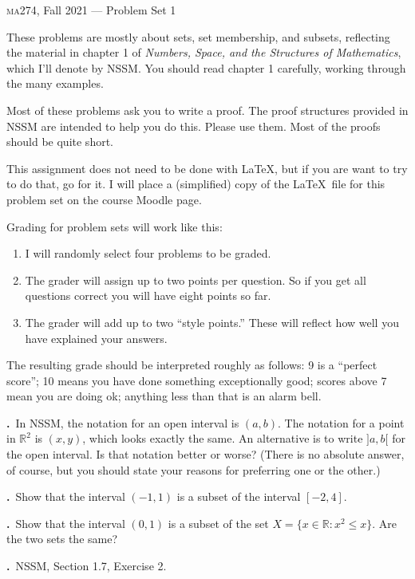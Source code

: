 \documentclass[12pt]{article}
\newcommand{\R}{\ensuremath{\mathbb{R}}}
\newcounter{wowser}
\newcommand{\wowser}{\stepcounter{wowser}\par\vspace{\baselineskip}\noindent\textbf{\thewowser.}~}
\begin{document}
\vspace*{\baselineskip}

\centerline{\large\textsc{ma}274, Fall 2021 --- Problem Set 1}

\vspace{2\baselineskip}

These problems are mostly about sets, set membership, and subsets,
reflecting the material in chapter 1 of \textit{Numbers, Space, and
  the Structures of Mathematics}, which I'll denote by NSSM. You
should read chapter 1 carefully, working through the many examples.

Most of these problems ask you to write a proof. The proof structures
provided in NSSM are intended to help you do this. Please use
them. Most of the proofs should be quite short.

This assignment does not need to be done with \LaTeX, but if you are
want to try to do that, go for it. I will place a (simplified) copy of
the \LaTeX\ file for this problem set on the course Moodle page.

Grading for problem sets will work like this:
\begin{enumerate}
\item I will randomly select four problems to be graded.
\item The grader will assign up to two points per question. So if you
  get all questions correct you will have eight points so far.
\item The grader will add up to two ``style points.'' These will
  reflect how well you have explained your answers.
\end{enumerate}
The resulting grade should be interpreted roughly as follows: 9 is a
``perfect score''; 10 means you have done something exceptionally
good; scores above 7 mean you are doing ok; anything less than that is
an alarm bell.

\wowser In NSSM, the notation for an open interval is $(a,b)$. The
notation for a point in $\R^2$ is $(x,y)$, which looks exactly the
same. An alternative is to write $]a,b[$ for the open interval. Is
that notation better or worse? (There is no absolute answer, of
course, but you should state your reasons for preferring one or the
other.)

\wowser Show that the interval $(-1,1)$ is a subset of the interval
$[-2,4]$.

\wowser Show that the interval $(0,1)$ is a subset of the set
$X=\{x\in\R : x^2\leq x\}$. Are the two sets the same?

\wowser NSSM, Section 1.7, Exercise 2.
\end{document}
